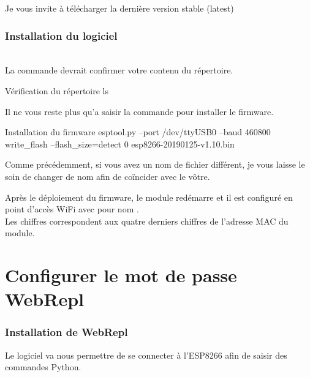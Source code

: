Je vous invite à télécharger la dernière version stable (latest)


\subsection{Installation du logiciel}

 \\

La commande  devrait confirmer votre contenu du répertoire.

\begin{Bash}{Vérification du répertoire}
ls
\end{Bash}


Il ne vous reste plus qu'a saisir la commande pour installer le firmware. \\
\begin{Bash}{Installation du firmware}
esptool.py --port /dev/ttyUSB0 --baud 460800 write_flash --flash_size=detect 0 esp8266-20190125-v1.10.bin
\end{Bash}

Comme précédemment, si vous avez un nom de fichier différent, je vous laisse le soin de changer de nom afin de coïncider avec le vôtre.


Après le déploiement du firmware, le module redémarre et il est configuré en point d’accès WiFi avec pour nom . \\ Les chiffres correspondent aux quatre derniers chiffres de l'adresse MAC du module. 


\chapter{Configurer le mot de passe WebRepl}

\subsection{Installation de WebRepl}

Le logiciel  va nous permettre de se connecter à l'ESP8266 afin de saisir des commandes Python.

